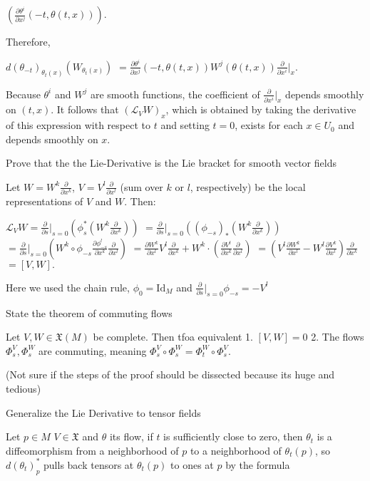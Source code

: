\(\left( \frac{\partial \theta^i}{\partial x^j}(-t, \theta(t, x)) \right).\)

Therefore,

\(d(\theta_{-t})_{\theta_t(x)}(W_{\theta_t(x)})\)
\(= \frac{\partial \theta^i}{\partial x^j}(-t, \theta(t, x)) W^j(\theta(t, x)) \frac{\partial}{\partial x^i} \bigg|_x.\)

Because \(\theta^i\) and \(W^j\) are smooth functions, the coefficient of \(\frac{\partial}{\partial x^i}|_x\) depends smoothly on \((t, x)\). 
It follows that \((\mathcal{L}_V W)_x\), which is obtained by taking the derivative of this expression with respect to \(t\) 
and setting \(t = 0\), exists for each \(x \in U_0\) and depends smoothly on \(x\).

Prove that the the Lie-Derivative is the Lie bracket for smooth vector fields

Let \(W = W^k \frac{\partial}{\partial x^k}\), \(V = V^l \frac{\partial}{\partial x^l}\) (sum over \(k\) or \(l\), respectively) 
be the local representations of \(V\) and \(W\). Then:

\(\mathcal{L}_V W = \frac{\partial}{\partial s}\bigg|_{s=0} \left( \phi_s^* (W^k \frac{\partial}{\partial x^k} ) \right) \)
\(= \frac{\partial}{\partial s}\bigg|_{s=0} \left( (\phi_{-s})_* (W^k \frac{\partial}{\partial x^k} ) \right)\)
\(= \frac{\partial}{\partial s}\bigg|_{s=0} \left( W^k \circ \phi_{-s} \frac{\partial \phi_{-s}^l}{\partial x^k} \frac{\partial}{\partial x^l} \right)\)
\(= \frac{\partial W^k}{\partial x^l} V^l \frac{\partial}{\partial x^k} + W^k \cdot \left( \frac{\partial V^l}{\partial x^k} \frac{\partial}{\partial x^l} \right)\)
\(= \left( V^l \frac{\partial W^k}{\partial x^l} - W^l \frac{\partial V^k}{\partial x^l} \right) \frac{\partial}{\partial x^k}\)
\(= [V, W].\)

Here we used the chain rule, \(\phi_0 = \text{Id}_M\) and \(\frac{\partial}{\partial s}\bigg|_{s=0} \phi_{-s} = -V^l\)


State the theorem of commuting flows

Let \( V, W \in \mathfrak{X}(M) \) be complete.
Then tfoa equivalent
1. \( [V, W] = 0 \)
2. The flows \( \Phi^V_s, \Phi^W_s \) are commuting, meaning \( \Phi^V_s \circ \Phi^W_s = \Phi^W_t \circ \Phi^V_s \).

(Not sure if the steps of the proof should be dissected because its huge and tedious)


Generalize the Lie Derivative to tensor fields

Let \( p \in M \) \( V \in \mathfrak{X}\) and \( \theta \) its flow, if \(t\) is sufficiently close to zero, 
then \(\theta_t\) is a diffeomorphism from a neighborhood of \(p\) to a neighborhood of \(\theta_t(p)\), 
so \(d(\theta_t)_p^*\) pulls back tensors at \(\theta_t(p)\) to ones at \(p\)
by the formula

